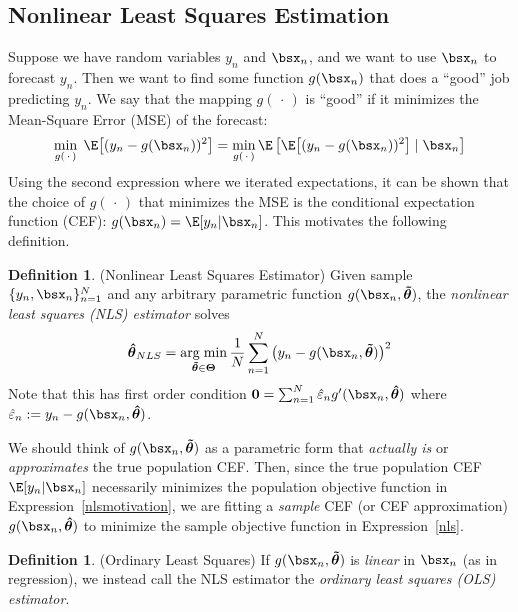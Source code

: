 \documentclass[12pt]{article}
\theoremstyle{plain}
\theoremstyle{definition}
\newtheorem{defn}[thm]{Definition}
\theoremstyle{remark}
\newcommand{\bsTheta}{\boldsymbol{\Theta}}
\newcommand{\bshattheta}{\boldsymbol{\hat{\theta}}}
\newcommand{\bstildetheta}{\boldsymbol{\tilde{\theta}}}
\renewcommand{\bso}{\boldsymbol{0}}
\DeclareMathOperator*{\argmin}{arg\;min}
\newcommand{\sumnN}{\sum^N_{n=1}}
\newcommand{\nN}{_{n=1}^N}
\begin{document}
\clearpage
\subsection{Nonlinear Least Squares Estimation}

Suppose we have random variables $y_n$ and $\bsx_n$, and we want to use
$\bsx_n$ to forecast $y_n$. Then we want to find some function
$g(\bsx_n)$ that does a ``good'' job predicting $y_n$. We say that
the mapping $g(\,\cdot\,)$ is ``good'' if it minimizes the Mean-Square
Error (MSE) of the forecast:
\begin{align}
  \min_{g(\,\cdot\,)} \; \E\big[(y_n - g(\bsx_n))^2\big]
  =
  \min_{g(\,\cdot\,)}
  \E\left[\E\big[(y_n - g(\bsx_n))^2\big] \;|\;\bsx_n\right]
  \label{nlsmotivation}
\end{align}
Using the second expression where we iterated expectations, it can be
shown that the choice of $g(\,\cdot\,)$ that minimizes the MSE is the
conditional expectation function (CEF): $g(\bsx_n)=\E[y_n|\bsx_n]$.
This motivates the following definition.

\begin{defn}(Nonlinear Least Squares Estimator)
Given sample $\{y_n,\bsx_n\}\nN$ and any arbitrary parametric function
$g(\bsx_n,\bstildetheta)$, the
\emph{nonlinear least squares (NLS) estimator} solves
\begin{align}
  \bshattheta_{NLS}
  = \argmin_{\bstildetheta\in\bsTheta}
  \frac{1}{N}\sumnN \big(y_n-g(\bsx_n,\bstildetheta)\big)^2
  \label{nls}
\end{align}
Note that this has first order condition
$\bso = \sumnN \hat{\varepsilon}_n g'(\bsx_n,\bshattheta)$
where $\hat{\varepsilon}_n := y_n-g(\bsx_n,\bshattheta)$.

We should think of $g(\bsx_n,\bstildetheta)$ as a parametric form that
\emph{actually is} or \emph{approximates} the true population CEF.
Then, since the true population CEF $\E[y_n|\bsx_n]$ necessarily
minimizes the population objective function in
Expression~\ref{nlsmotivation}, we are fitting a \emph{sample} CEF (or
CEF approximation) $g(\bsx_n,\bshattheta)$ to minimize the sample
objective function in Expression~\ref{nls}.
\end{defn}

\begin{defn}(Ordinary Least Squares)
If $g(\bsx_n,\bstildetheta)$ is \emph{linear} in $\bsx_n$ (as in
regression), we instead call the NLS estimator the \emph{ordinary least
squares (OLS) estimator}.
\end{defn}
\end{document}
